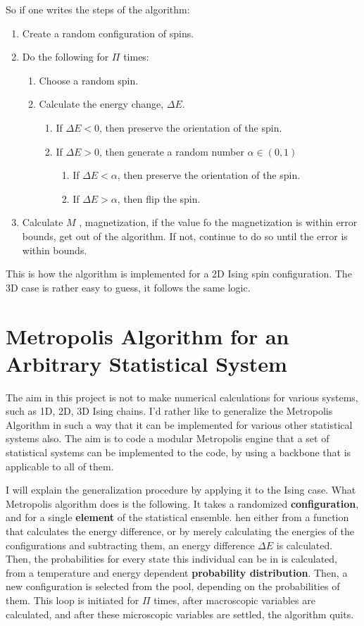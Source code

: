 So if one writes the steps of the algorithm:
\begin{enumerate}
\item Create a random configuration of spins.
\item Do the following for $ \Pi $ times:
	\begin{enumerate}
	\item Choose a random spin.
	\item Calculate the energy change, $ \Delta E $.
		\begin{enumerate}
		\item If $ \Delta E < 0 $, then preserve the orientation of the spin.
		\item If $ \Delta E > 0 $, then generate a random number $ \alpha \in (0,1) $
			\begin{enumerate}
			\item If $ \Delta E < \alpha $, then preserve the orientation of the spin.
			\item If $ \Delta E > \alpha $, then flip the spin.
			\end{enumerate}
		\end{enumerate}
	\end{enumerate}
\item Calculate $ M $ , magnetization, if the value fo the magnetization is within error bounds, get out of the algorithm. If not, continue to do so until the error is within bounds.  
\end{enumerate}

This is how the algorithm is implemented for a 2D Ising spin configuration. The 3D case is rather easy to guess, it follows the same logic.

\section{Metropolis Algorithm for an Arbitrary Statistical System}

The aim in this project is not to make numerical calculations for various systems, such as 1D, 2D, 3D Ising chains. I'd rather like to generalize the Metropolis Algorithm in such a way that it can be implemented for various other statistical systems also. The aim is to code a modular Metropolis engine that a set of statistical systems can be implemented to the code, by using a backbone that is applicable to all of them. 

I will explain the generalization procedure by applying it to the Ising case. What Metropolis algorithm does is the following. It takes a randomized \textbf{configuration}, and for a single \textbf{element} of the statistical ensemble.  hen either from a function that calculates the energy difference, or by merely calculating the energies of the configurations and subtracting them, an energy difference $ \Delta E $ is calculated. Then, the probabilities for every state this individual can be in is calculated, from a temperature and energy dependent \textbf{probability distribution}. Then, a new configuration is selected from the pool, depending on the probabilities of them. This loop is initiated for $ \Pi $ times, after macroscopic variables are calculated, and after these microscopic variables are settled, the algorithm quits. 

